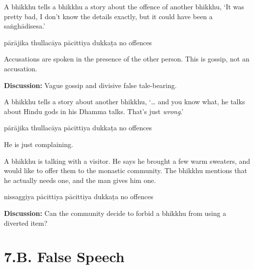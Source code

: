 \begin{exam}{\autoExamName}
\begin{problem*}
\begin{parts}
  \bigskip

\item A bhikkhu tells a bhikkhu a story about the offence of another bhikkhu,
  `It was pretty bad, I don't know the details exactly, but it could have been a
  saṅghādisesa.'

  \bigskip

  \begin{answers}{5}
    \bChoices
     pārājika\eAns
     thullacāya\eAns
     pācittiya\eAns
     dukkaṭa\eAns
     no offences\eAns
    \eChoices
  \end{answers}

  \begin{solution}
    Accusations are spoken in the presence of the other person.
    This is gossip, not an accusation.
  \end{solution}

  \bigskip

  \textbf{Discussion:} Vague gossip and divisive false tale-bearing.

  \bigskip

\item A bhikkhu tells a story about another bhikkhu, `\ldots{} and you know
  what, he talks about Hindu gods in his Dhamma talks. That's just
  \textit{wrong}.'

  \bigskip

  \begin{answers}{5}
    \bChoices
     pārājika\eAns
     thullacāya\eAns
     pācittiya\eAns
     dukkaṭa\eAns
     no offences\eAns
    \eChoices
  \end{answers}

  \begin{solution}
    He is just complaining.
  \end{solution}

  \bigskip

\item A bhikkhu is talking with a visitor. He says he brought a few warm
  sweaters, and would like to offer them to the monastic community. The bhikkhu
  mentions that he actually needs one, and the man gives him one.

  \bigskip

  \begin{answers}{4}
    \bChoices
     nissaggiya pācittiya\eAns
     pācittiya\eAns
     dukkaṭa\eAns
     no offences\eAns
    \eChoices
  \end{answers}

  \bigskip

  \textbf{Discussion:} Can the community decide to forbid a bhikkhu from using a
  diverted item?

\end{parts}

\end{problem*}

\end{exam}

\chapter{7.B. False Speech}
\renewcommand*{\theChapterTitle}{7.B. False Speech}
